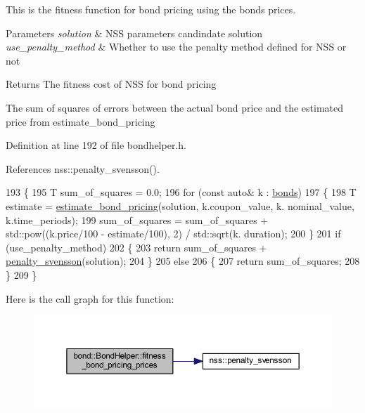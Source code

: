This is the fitness function for bond pricing using the bonds\textquotesingle{} prices. 


\begin{DoxyParams}{Parameters}
{\em solution} & N\+SS parameters candindate solution \\
\hline
{\em use\+\_\+penalty\+\_\+method} & Whether to use the penalty method defined for N\+SS or not \\
\hline
\end{DoxyParams}
\begin{DoxyReturn}{Returns}
The fitness cost of N\+SS for bond pricing 
\end{DoxyReturn}
The sum of squares of errors between the actual bond price and the estimated price from estimate\+\_\+bond\+\_\+pricing 

Definition at line 192 of file bondhelper.\+h.



References nss\+::penalty\+\_\+svensson().


\begin{DoxyCode}
193     \{
195         T sum\_of\_squares = 0.0;
196         \textcolor{keywordflow}{for} (\textcolor{keyword}{const} \textcolor{keyword}{auto}& k : \hyperlink{classbond_1_1_bond_helper_a61db751f82d46ce2f7f5032ff2a3b03e}{bonds})
197         \{
198             T estimate = \hyperlink{classbond_1_1_bond_helper_a1288528021e7c60e3a1435d39ad8611d}{estimate\_bond\_pricing}(solution, k.coupon\_value, k.
      nominal\_value, k.time\_periods);
199             sum\_of\_squares = sum\_of\_squares + std::pow((k.price/100 - estimate/100), 2) / std::sqrt(k.
      duration);
200         \}
201         \textcolor{keywordflow}{if} (use\_penalty\_method)
202         \{
203             \textcolor{keywordflow}{return} sum\_of\_squares + \hyperlink{namespacenss_a009a0ebbca20f7969d0c2ed5a241aa82}{penalty\_svensson}(solution);
204         \}
205         \textcolor{keywordflow}{else}
206         \{
207             \textcolor{keywordflow}{return} sum\_of\_squares;
208         \}
209     \}
\end{DoxyCode}
Here is the call graph for this function\+:
\nopagebreak
\begin{figure}[H]
\begin{center}
\leavevmode
\includegraphics[width=350pt]{classbond_1_1_bond_helper_a507eddab3d55ad3e640dfa930dcf43d0_cgraph}
\end{center}
\end{figure}
\mbox{\label{classbond_1_1_bond_helper_aa1a47c41374aee7914e9c0ac374b39e4}} 
